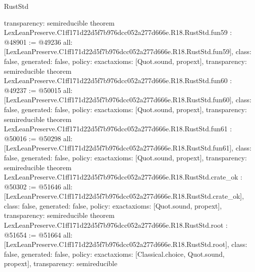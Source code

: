 \begin{lexlean}{RustStd}
\begin{coremodule}
{  transparency: semireducible
}
theorem LexLeanPreserve.C1ff171d22d5f7b976dcc052a277d666e.R18.RustStd.fun59 : @48901 := @49236 {
  all: [LexLeanPreserve.C1ff171d22d5f7b976dcc052a277d666e.R18.RustStd.fun59],
  class: false,
  generated: false,
  policy: exact{axioms: [Quot.sound, propext]},
  transparency: semireducible
}
theorem LexLeanPreserve.C1ff171d22d5f7b976dcc052a277d666e.R18.RustStd.fun60 : @49237 := @50015 {
  all: [LexLeanPreserve.C1ff171d22d5f7b976dcc052a277d666e.R18.RustStd.fun60],
  class: false,
  generated: false,
  policy: exact{axioms: [Quot.sound, propext]},
  transparency: semireducible
}
theorem LexLeanPreserve.C1ff171d22d5f7b976dcc052a277d666e.R18.RustStd.fun61 : @50016 := @50298 {
  all: [LexLeanPreserve.C1ff171d22d5f7b976dcc052a277d666e.R18.RustStd.fun61],
  class: false,
  generated: false,
  policy: exact{axioms: [Quot.sound, propext]},
  transparency: semireducible
}
theorem LexLeanPreserve.C1ff171d22d5f7b976dcc052a277d666e.R18.RustStd.crate_ok : @50302 := @51646 {
  all: [LexLeanPreserve.C1ff171d22d5f7b976dcc052a277d666e.R18.RustStd.crate_ok],
  class: false,
  generated: false,
  policy: exact{axioms: [Quot.sound, propext]},
  transparency: semireducible
}
theorem LexLeanPreserve.C1ff171d22d5f7b976dcc052a277d666e.R18.RustStd.root : @51654 := @51664 {
  all: [LexLeanPreserve.C1ff171d22d5f7b976dcc052a277d666e.R18.RustStd.root],
  class: false,
  generated: false,
  policy: exact{axioms: [Classical.choice, Quot.sound, propext]},
  transparency: semireducible
}


\end{coremodule}
\end{lexlean}
